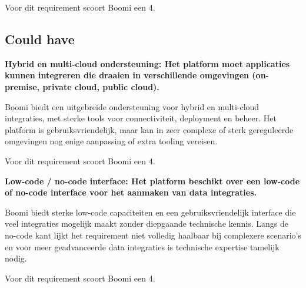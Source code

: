 Voor dit requirement scoort Boomi een 4.

\vspace{\baselineskip}

\subsection{Could have}%
\label{CouldHaveBoomi}

\textbf{Hybrid en multi-cloud ondersteuning: Het platform moet applicaties kunnen integreren die draaien in verschillende omgevingen (on-premise, private cloud, public cloud).}

\vspace{\baselineskip}

Boomi biedt een uitgebreide ondersteuning voor hybrid en multi-cloud integraties, met sterke tools voor connectiviteit, deployment en beheer. Het platform is gebruiksvriendelijk, maar kan in zeer complexe of sterk gereguleerde omgevingen nog enige aanpassing of extra tooling vereisen.

Voor dit requirement scoort Boomi een 4.

\vspace{\baselineskip}

\textbf{Low-code / no-code interface: Het platform beschikt over een low-code of no-code interface voor het aanmaken van data integraties.}

\vspace{\baselineskip}

Boomi biedt sterke low-code capaciteiten en een gebruiksvriendelijk interface die veel integraties mogelijk maakt zonder diepgaande technische kennis. Langs de no-code kant lijkt het requirement niet volledig haalbaar bij complexere scenario's en voor meer geadvanceerde data integraties is technische expertise tamelijk nodig.

Voor dit requirement scoort Boomi een 4.

\newpage

